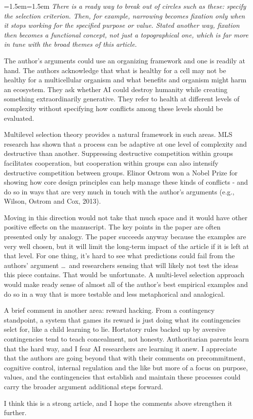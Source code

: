 \documentclass[fontsize=11.5pt]{scrartcl}
\newcounter{point}
\newenvironment{reviewernote}
  {\par\medskip\begingroup\leftskip=1.5em\rightskip=1.5em\itshape\color{reviewercolor}}
  {\par\endgroup\medskip}
\begin{document}
\begin{reviewernote}
There is a ready way to break out of circles such as these: specify the selection criterion. Then, for example, narrowing becomes fixation only when it stops working for the specified purpose or value. Stated another way, fixation then becomes a functional concept, not just a topographical one, which is far more in tune with the broad themes of this article.

The author's arguments could use an organizing framework and one is readily at hand. The authors acknowledge that what is healthy for a cell may not be healthy for a multicellular organism and what benefits and organism might harm an ecosystem. They ask whether AI could destroy humanity while creating something extraordinarily generative. They refer to health at different levels of complexity without specifying how conflicts among these levels should be evaluated.

Multilevel selection theory provides a natural framework in such areas. MLS research has shown that a process can be adaptive at one level of complexity and destructive than another. Suppressing destructive competition within groups facilitates cooperation, but cooperation within groups can also intensify destructive competition between groups. Elinor Ostrom won a Nobel Prize for showing how core design principles can help manage these kinds of conflicts - and do so in ways that are very much in touch with the author's arguments (e.g., Wilson, Ostrom and Cox, 2013).

Moving in this direction would not take that much space and it would have other positive effects on the manuscript. The key points in the paper are often presented only by analogy. The paper succeeds anyway because the examples are very well chosen, but it will limit the long-term impact of the article if it is left at that level. For one thing, it's hard to see what predictions could fail from the authors' argument \ldots\ and researchers sensing that will likely not test the ideas this piece contains. That would be unfortunate. A multi-level selection approach would make ready sense of almost all of the author's best empirical examples and do so in a way that is more testable and less metaphorical and analogical.

A brief comment in another area: reward hacking. From a contingency standpoint, a system that games its reward is just doing what its contingencies selct for, like a child learning to lie. Hortatory rules backed up by aversive contingencies tend to teach concealment, not honesty. Authoritarian parents learn that the hard way, and I fear AI researchers are learning it anew. I appreciate that the authors are going beyond that with their comments on precommitment, cognitive control, internal regulation and the like but more of a focus on purpose, values, and the contingencies that establish and maintain these processes could carry the broader argument additional steps forward.

I think this is a strong article, and I hope the comments above strengthen it further.
\end{reviewernote}
\end{document}
